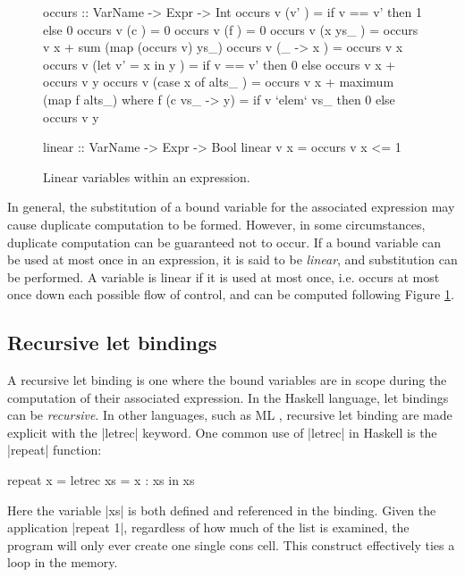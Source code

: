 \begin{figure}
\begin{code}
occurs :: VarName -> Expr -> Int
occurs v (v'                ) = if v == v' then 1 else 0
occurs v (c                 ) = 0
occurs v (f                 ) = 0
occurs v (x ys_             ) = occurs v x + sum (map (occurs v) ys_)
occurs v (\vs_ -> x         ) = occurs v x
occurs v (let v' = x in y   ) = if v == v' then 0 else occurs v x + occurs v y
occurs v (case x of alts_   ) = occurs v x + maximum (map f alts_)
    where f (c vs_ -> y) = if v `elem` vs_ then 0 else occurs v y

linear :: VarName -> Expr -> Bool
linear v x = occurs v x <= 1
\end{code}
\caption{Linear variables within an expression.}
\label{fig:linear}
\end{figure}

In general, the substitution of a bound variable for the associated expression may cause duplicate computation to be formed. However, in some circumstances, duplicate computation can be guaranteed not to occur. If a bound variable can be used at most once in an expression, it is said to be \textit{linear}, and substitution can be performed. A variable is linear if it is used at most once, i.e. occurs at most once down each possible flow of control, and can be computed following Figure \ref{fig:linear}.

\subsection{Recursive let bindings}

A recursive let binding is one where the bound variables are in scope during the computation of their associated expression. In the Haskell language, let bindings can be \textit{recursive}. In other languages, such as ML \cite{ml}, recursive let binding are made explicit with the |letrec| keyword. One common use of |letrec| in Haskell is the |repeat| function:

\begin{example}
\begin{code}
repeat x =  letrec xs = x : xs
            in xs
\end{code}

Here the variable |xs| is both defined and referenced in the binding. Given the application |repeat 1|, regardless of how much of the list is examined, the program will only ever create one single cons cell. This construct effectively ties a loop in the memory.
\end{example}

